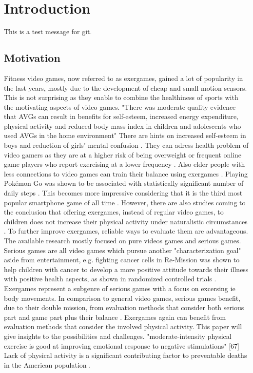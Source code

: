 \chapter{Introduction}

This is a test message for git.

\section{Motivation}
Fitness video games, now referred to as exergames, gained a lot of popularity in the last years, mostly due to the development of cheap and small motion sensors. This is not surprising as they enable to combine the healthiness of sports with the motivating aspects of video games.
"There was moderate quality evidence that AVGs can result in benefits for self-esteem, increased energy expenditure, physical activity and reduced body mass index in children and adolescents who used AVGs in the home environment" \cite{santos2020active}
There are hints on increased self-esteem in boys and reduction of girls’ mental confusion \cite{andrade2020effect}.
They can adress health problem of video gamers as they are at a higher risk of being overweight \cite{melchior2014internet} or frequent online game players who report exercising at a lower frequency \cite{kowert2014unpopular}. Also elder people with less connections to video games can train their balance using exergames \cite{lai2013effects}. Playing Pokémon Go was shown to be associated with statistically significant number of daily steps \cite{khamzina2019impact}. This becomes more impressive considering that it is the third most popular smartphone game of all time \cite{link_pokemongo}. However, there are also studies coming to the conclusion that offering exergames, instead of regular video games, to children does not increase their physical activity under naturalistic circumstances \cite{baranowski2012impact}. 
To further improve exergames, reliable ways to evaluate them are advantageous. The available research mostly focused on pure videos games and serious games. Serious games are all video games which pursue another "characterization goal" aside from entertainment, e.g. fighting cancer cells in Re-Mission \cite{link_remission} was shown to help children with cancer to develop a more positive attitude towards their illness with positive health aspects, as shown in randomized controlled trials \cite{kato2008video}.
Exergames represent a subgenre of serious games with a focus on excersing ie body movements. In comparison to general video games, serious games benefit, due to their double mission, from evaluation methods that consider both serious part and game part plus their balance \cite{caserman2020quality}. Exergames again can benefit from evaluation methods that consider the involved physical activity. This paper will give insights to the possibilities and challenges.
"moderate-intensity physical exercise is good at improving emotional response to negative stimulations" [67]
Lack of physical activity is a significant contributing factor to preventable deaths in the American population \cite{bauer2014prevention}.

